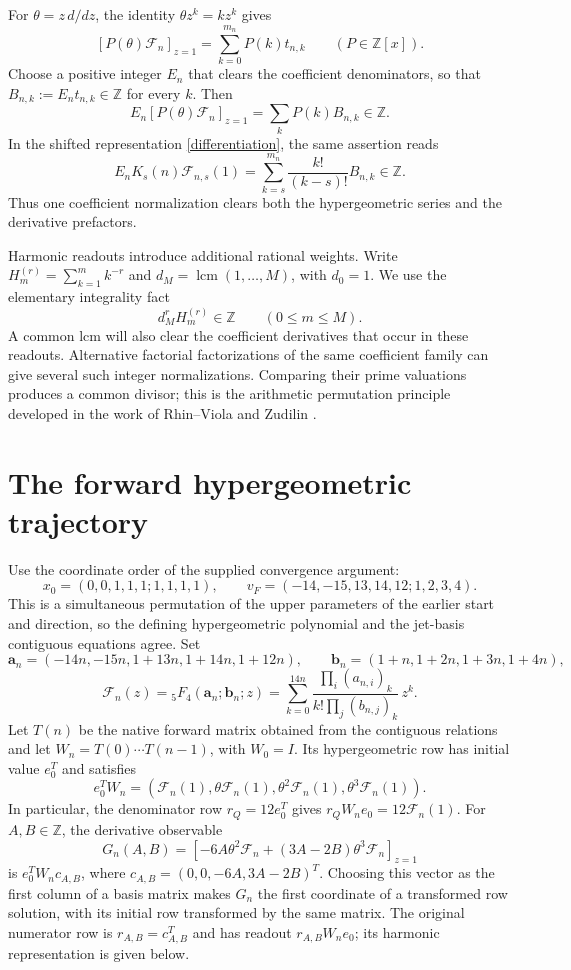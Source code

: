 \documentclass[11pt]{article}
\newcommand{\Z}{\mathbb Z}
\newcommand{\F}{\mathcal F}
\begin{document}
For $\theta=z\,d/dz$, the identity $\theta z^k=kz^k$ gives
\begin{equation}\label{polynomial-weight}
 [P(\theta)\F_n]_{z=1}=\sum_{k=0}^{m_n}P(k)t_{n,k}
 \qquad(P\in\Z[x]).
\end{equation}
Choose a positive integer $E_n$ that clears the coefficient denominators,
so that $B_{n,k}:=E_nt_{n,k}\in\Z$ for every $k$. Then
\begin{equation}\label{integer-weight}
 E_n[P(\theta)\F_n]_{z=1}=\sum_kP(k)B_{n,k}\in\Z.
\end{equation}
In the shifted representation \eqref{differentiation}, the same assertion
reads
\[
 E_nK_s(n)\F_{n,s}(1)
 =\sum_{k=s}^{m_n}\frac{k!}{(k-s)!}B_{n,k}\in\Z.
\]
Thus one coefficient normalization clears both the hypergeometric
series and the derivative prefactors.

Harmonic readouts introduce additional rational weights. Write
$H_m^{(r)}=\sum_{k=1}^m k^{-r}$ and
$d_M=\operatorname{lcm}(1,\ldots,M)$, with $d_0=1$.
We use the elementary integrality fact
\begin{equation}\label{harmonic-integrality}
 d_M^rH_m^{(r)}\in\Z\qquad(0\leq m\leq M).
\end{equation}
A common lcm will also clear the coefficient derivatives that occur
in these readouts. Alternative factorial factorizations of the same
coefficient family can give several such integer normalizations.
Comparing their prime valuations produces a common divisor; this is the
arithmetic permutation principle developed in the work of Rhin--Viola
and Zudilin \cite{RV,Zudilin}.

\section{The forward hypergeometric trajectory}
Use the coordinate order of the supplied convergence argument:
\[
 x_0=(0,0,1,1,1;1,1,1,1),\qquad
 v_F=(-14,-15,13,14,12;1,2,3,4).
\]
This is a simultaneous permutation of the upper parameters of the
earlier start and direction, so the defining hypergeometric polynomial
and the jet-basis contiguous equations agree. Set
\[
 \mathbf a_n=(-14n,-15n,1+13n,1+14n,1+12n),\qquad
 \mathbf b_n=(1+n,1+2n,1+3n,1+4n),
\]
\[
 \F_n(z)={}_5F_4(\mathbf a_n;\mathbf b_n;z)
 =\sum_{k=0}^{14n}
 \frac{\prod_i(a_{n,i})_k}{k!\prod_j(b_{n,j})_k}\,z^k.
\]
Let $T(n)$ be the native forward matrix obtained from the contiguous
relations and let $W_n=T(0)\cdots T(n-1)$, with $W_0=I$.
Its hypergeometric row has initial value $e_0^T$ and satisfies
\[
 e_0^TW_n=(\F_n(1),\theta\F_n(1),\theta^2\F_n(1),\theta^3\F_n(1)).
\]
In particular, the denominator row $r_Q=12e_0^T$ gives
$r_QW_ne_0=12\F_n(1)$.
For $A,B\in\Z$, the derivative observable
\[
 G_n(A,B)=[-6A\theta^2\F_n+(3A-2B)\theta^3\F_n]_{z=1}
\]
is $e_0^TW_nc_{A,B}$, where
$c_{A,B}=(0,0,-6A,3A-2B)^T$.
Choosing this vector as the first column of a basis matrix makes $G_n$
the first coordinate of a transformed row solution, with its initial
row transformed by the same matrix.
The original numerator row is $r_{A,B}=c_{A,B}^T$ and has readout
$r_{A,B}W_ne_0$; its harmonic representation is given below.
\end{document}
